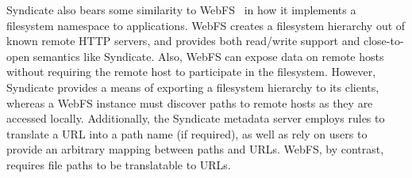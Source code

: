 {Syndicate also bears some similarity to WebFS~\cite{webfs} in how it implements a filesystem namespace to applications.
WebFS creates a filesystem hierarchy out of known remote HTTP servers, and provides both read/write 
support and close-to-open semantics like Syndicate.  Also, WebFS can expose data on
remote hosts without requiring the remote host to participate in the filesystem.  However, Syndicate
provides a means of exporting a filesystem hierarchy to its clients, whereas a WebFS instance must
discover paths to remote hosts as they are accessed locally.  Additionally, the Syndicate metadata server
employs rules to translate a URL into a path name (if required), as well as rely on users
to provide an arbitrary mapping between paths and URLs.  WebFS, by contrast, requires file paths to be translatable to URLs.

}
